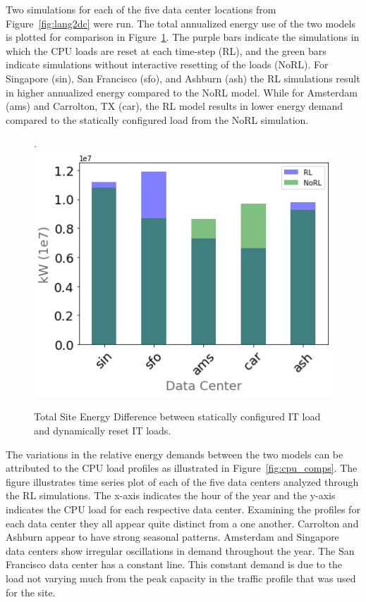 \documentclass[twocolumn, a4paper,10pt]{article}
\begin{document}
Two simulations for each of the five data center locations from Figure~\ref{fig:lang2dc} were run. The total annualized energy use of the two models is plotted for comparison in Figure~\ref{fig:total_energy_comp}. The purple bars indicate the simulations in which the CPU loads are reset at each time-step (RL), and the green bars indicate simulations without interactive resetting of the loads (NoRL). For Singapore (sin), San Francisco (sfo), and Ashburn (ash) the RL simulations result in higher annualized energy compared to the NoRL model. While for Amsterdam (ams) and Carrolton, TX (car), the RL model results in lower energy demand compared to the statically configured load from the NoRL simulation.

\begin{figure}.
  \centering
  \includegraphics[scale=0.45]{img/total_energy_comp.png}
  \caption{Total Site Energy Difference between statically configured IT load and dynamically reset IT loads.}
  \label{fig:total_energy_comp}
  \end{figure}

The variations in the relative energy demands between the two models can be attributed to the CPU load profiles as illustrated in Figure~\ref{fig:cpu_comps}. The figure illustrates time series plot of each of the five data centers analyzed through the RL simulations. The x-axis indicates the hour of the year and the y-axis indicates the CPU load for each respective data center. Examining the profiles for each data center they all appear quite distinct from a one another. Carrolton and Ashburn appear to have strong seasonal patterns. Amsterdam and Singapore data centers show irregular oscillations in demand throughout the year. The San Francisco data center has a constant line. This constant demand is due to the load not varying much from the peak capacity in the traffic profile that was used for the site. 
\end{document}
